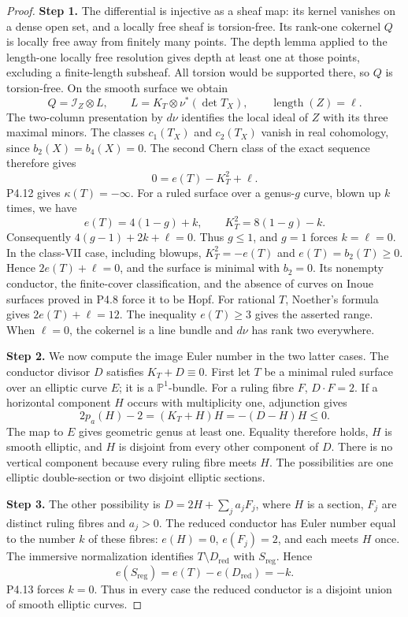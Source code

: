 \begin{proof}
\noindent\textbf{Step 1.} The differential is injective as a sheaf map: its kernel vanishes
on a dense open set, and a locally free sheaf is torsion-free.
Its rank-one cokernel $Q$ is locally free away from finitely many
points. The depth lemma applied to the length-one locally free
resolution gives depth at least one at those points, excluding
a finite-length subsheaf. All torsion would be supported there,
so $Q$ is torsion-free. On the smooth surface we obtain
\[
 Q=\mathcal I_Z\otimes L,\qquad
 L=K_T\otimes\nu^*(\det T_X),\qquad \operatorname{length}(Z)=\ell.
\]
The two-column presentation by $d\nu$ identifies the local ideal
of $Z$ with its three maximal minors. The classes $c_1(T_X)$ and
$c_2(T_X)$ vanish in real cohomology, since $b_2(X)=b_4(X)=0$.
The second Chern class of the exact sequence therefore gives
\[
 0=e(T)-K_T^2+\ell.
\]
P4.12 gives $\kappa(T)=-\infty$. For a ruled surface over a
genus-$g$ curve, blown up $k$ times, we have
\[
 e(T)=4(1-g)+k,\qquad K_T^2=8(1-g)-k.
\]
Consequently $4(g-1)+2k+\ell=0$. Thus $g\leq1$, and $g=1$
forces $k=\ell=0$. In the class-VII case, including blowups,
$K_T^2=-e(T)$ and $e(T)=b_2(T)\geq0$. Hence
$2e(T)+\ell=0$, and the surface is minimal with $b_2=0$.
Its nonempty conductor, the finite-cover classification, and the
absence of curves on Inoue surfaces proved in P4.8 force it to
be Hopf. For rational $T$, Noether's formula gives
$2e(T)+\ell=12$. The inequality $e(T)\geq3$ gives the asserted
range. When $\ell=0$, the cokernel is a line bundle and $d\nu$
has rank two everywhere.

\noindent\textbf{Step 2.} We now compute the image Euler number in the two latter cases.
The conductor divisor $D$ satisfies $K_T+D\equiv0$. First let
$T$ be a minimal ruled surface over an elliptic curve $E$;
it is a $\mathbb P^1$-bundle. For a ruling fibre $F$, $D\cdot F=2$.
If a horizontal component $H$ occurs with multiplicity one,
adjunction gives
\[
 2p_a(H)-2=(K_T+H)H=-(D-H)H\leq0.
\]
The map to $E$ gives geometric genus at least one. Equality
therefore holds, $H$ is smooth elliptic, and $H$ is disjoint
from every other component of $D$. There is no vertical
component because every ruling fibre meets $H$. The possibilities
are one elliptic double-section or two disjoint elliptic sections.

\noindent\textbf{Step 3.} The other possibility is $D=2H+\sum_j a_jF_j$, where $H$ is a
section, $F_j$ are distinct ruling fibres and $a_j>0$.
The reduced conductor has Euler number equal to the number $k$
of these fibres: $e(H)=0$, $e(F_j)=2$, and each meets $H$ once.
The immersive normalization identifies $T\setminus D_{\mathrm{red}}$
with $S_{\mathrm{reg}}$. Hence
\[
 e(S_{\mathrm{reg}})=e(T)-e(D_{\mathrm{red}})=-k.
\]
P4.13 forces $k=0$. Thus in every case the reduced conductor is
a disjoint union of smooth elliptic curves.


\end{proof}
